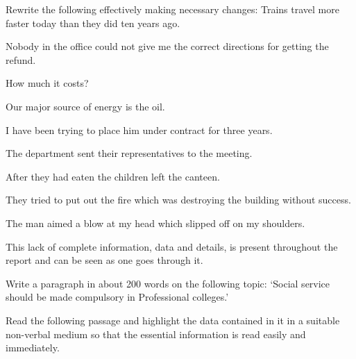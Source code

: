 \markB

\newpage \again

\partC

\item \iitem Rewrite the following effectively making necessary changes:
\iitem Trains travel more faster today than they did ten years ago.
\item Nobody in the office could not give me the correct directions for getting the refund.
\item How much it costs?
\item Our major source of energy is the oil.
\item I have been trying to place him under contract for three years.
\item The department sent their representatives to the meeting.
\item After they had eaten the children left the canteen.
\item They tried to put out the fire which was destroying the building
  without success.
\item The man aimed a blow at my head which slipped off on my shoulders.
\item This lack of complete information, data and details, is present throughout the report
  and can be seen as one goes through it.
\ene
\Or
\item Write a paragraph in about 200 words on the following topic: `Social service should be made
  compulsory in Professional colleges.'
\ene

\item \iitem Read the following passage and highlight the data contained in it in a suitable non-verbal
  medium so that the essential information is read easily and immediately.\\
  
